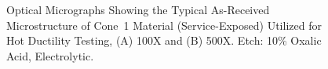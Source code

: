 \begin{figure}
\centering
{}

\caption[Optical Micrographs Showing the Typical As-Received Microstructure of Cone~1 Material.]{Optical Micrographs Showing the Typical As-Received Microstructure of Cone~1 Material (Service-Exposed) Utilized for Hot Ductility Testing, (A) 100X and (B) 500X.  Etch: 10\% Oxalic Acid, Electrolytic.}
\label{fig:c1-asreceived}
\end{figure}

